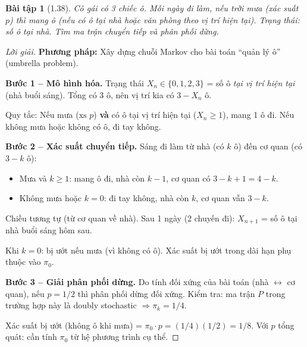 \documentclass[8pt,a4paper]{article}
\newtheorem{exercise}{Bài tập}
\newenvironment{solution}{\begin{proof}[Lời giải]}{\end{proof}}
\begin{document}
\begin{exercise}[1.38]
Cô gái có 3 chiếc ô. Mỗi ngày đi làm, nếu trời mưa (xác suất $p$) thì mang ô (nếu có ô tại nhà hoặc văn phòng theo vị trí hiện tại). Trạng thái: số ô tại nhà. Tìm ma trận chuyển tiếp và phân phối dừng.
\end{exercise}
\begin{solution}
\textbf{Phương pháp:} Xây dựng chuỗi Markov cho bài toán ``quản lý ô'' (umbrella problem).

\textbf{Bước 1 -- Mô hình hóa.}
Trạng thái $X_n \in \{0,1,2,3\}$ = số ô \emph{tại vị trí hiện tại} (nhà buổi sáng). Tổng có 3 ô, nên vị trí kia có $3 - X_n$ ô.

Quy tắc: Nếu mưa ($\text{xs } p$) \textbf{và} có ô tại vị trí hiện tại ($X_n \geq 1$), mang 1 ô đi. Nếu không mưa hoặc không có ô, đi tay không.

\textbf{Bước 2 -- Xác suất chuyển tiếp.}
Sáng đi làm từ nhà (có $k$ ô) đến cơ quan (có $3-k$ ô):
\begin{itemize}
  \item Mưa và $k \geq 1$: mang ô đi, nhà còn $k-1$, cơ quan có $3-k+1 = 4-k$.
  \item Không mưa hoặc $k = 0$: đi tay không, nhà còn $k$, cơ quan vẫn $3-k$.
\end{itemize}
Chiều tương tự (từ cơ quan về nhà). Sau 1 ngày (2 chuyến đi): $X_{n+1}$ = số ô tại nhà buổi sáng hôm sau.

Khi $k = 0$: bị ướt nếu mưa (vì không có ô). Xác suất bị ướt trong dài hạn phụ thuộc vào $\pi_0$.

\textbf{Bước 3 -- Giải phân phối dừng.}
Do tính đối xứng của bài toán (nhà $\leftrightarrow$ cơ quan), nếu $p = 1/2$ thì phân phối dừng đối xứng. Kiểm tra: ma trận $P$ trong trường hợp này là doubly stochastic $\Rightarrow \pi_k = 1/4$.

Xác suất bị ướt (không ô khi mưa) = $\pi_0 \cdot p = (1/4)(1/2) = 1/8$. Với $p$ tổng quát: cần tính $\pi_0$ từ hệ phương trình cụ thể.
\end{solution}
\end{document}
